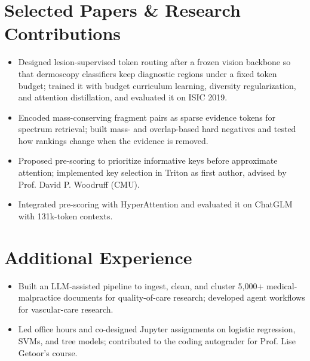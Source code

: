 \documentclass[10pt]{article}
\begin{document}
\section{Selected Papers \& Research Contributions}
\begin{itemize}
\item Designed lesion-supervised token routing after a frozen vision backbone so that dermoscopy classifiers keep diagnostic regions under a fixed token budget; trained it with budget curriculum learning, diversity regularization, and attention distillation, and evaluated it on ISIC 2019.
\end{itemize}
\begin{itemize}
\item Encoded mass-conserving fragment pairs as sparse evidence tokens for spectrum retrieval; built mass- and overlap-based hard negatives and tested how rankings change when the evidence is removed.
\end{itemize}
\begin{itemize}
\item Proposed pre-scoring to prioritize informative keys before approximate attention; implemented key selection in Triton as first author, advised by Prof. David P. Woodruff (CMU).
\item Integrated pre-scoring with HyperAttention and evaluated it on ChatGLM with 131k-token contexts.
\end{itemize}

\section{Additional Experience}
\begin{itemize}
\item Built an LLM-assisted pipeline to ingest, clean, and cluster 5,000+ medical-malpractice documents for quality-of-care research; developed agent workflows for vascular-care research.
\end{itemize}
\begin{itemize}
\item Led office hours and co-designed Jupyter assignments on logistic regression, SVMs, and tree models; contributed to the coding autograder for Prof. Lise Getoor's course.
\end{itemize}
\end{document}
